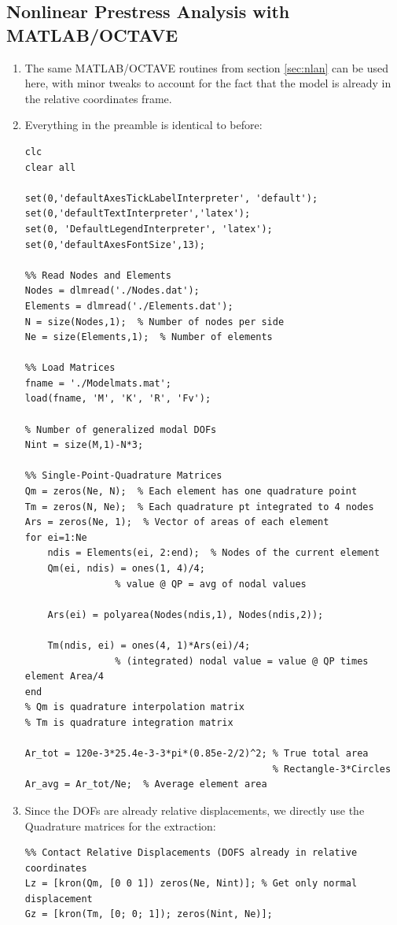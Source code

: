 \documentclass[11pt]{article}
\begin{document}
\subsection{Nonlinear Prestress Analysis with MATLAB/OCTAVE}
\label{sec:orgcf2c400}
\begin{enumerate}
\item The same MATLAB/OCTAVE routines from section \ref{sec:nlan} can be used here, with minor tweaks to account for the fact that the model is already in the relative coordinates frame.
\item Everything in the preamble is identical to before:
\begin{verbatim}
clc
clear all

set(0,'defaultAxesTickLabelInterpreter', 'default');
set(0,'defaultTextInterpreter','latex');
set(0, 'DefaultLegendInterpreter', 'latex');
set(0,'defaultAxesFontSize',13);

%% Read Nodes and Elements
Nodes = dlmread('./Nodes.dat');
Elements = dlmread('./Elements.dat');
N = size(Nodes,1);  % Number of nodes per side
Ne = size(Elements,1);  % Number of elements

%% Load Matrices
fname = './Modelmats.mat';
load(fname, 'M', 'K', 'R', 'Fv');

% Number of generalized modal DOFs
Nint = size(M,1)-N*3;

%% Single-Point-Quadrature Matrices
Qm = zeros(Ne, N);  % Each element has one quadrature point
Tm = zeros(N, Ne);  % Each quadrature pt integrated to 4 nodes
Ars = zeros(Ne, 1);  % Vector of areas of each element
for ei=1:Ne
    ndis = Elements(ei, 2:end);  % Nodes of the current element
    Qm(ei, ndis) = ones(1, 4)/4;
                % value @ QP = avg of nodal values

    Ars(ei) = polyarea(Nodes(ndis,1), Nodes(ndis,2));

    Tm(ndis, ei) = ones(4, 1)*Ars(ei)/4;
                % (integrated) nodal value = value @ QP times element Area/4
end
% Qm is quadrature interpolation matrix
% Tm is quadrature integration matrix

Ar_tot = 120e-3*25.4e-3-3*pi*(0.85e-2/2)^2; % True total area
                                            % Rectangle-3*Circles
Ar_avg = Ar_tot/Ne;  % Average element area
\end{verbatim}
\item Since the DOFs are already relative displacements, we directly use the Quadrature matrices for the extraction:
\begin{verbatim}
%% Contact Relative Displacements (DOFS already in relative coordinates
Lz = [kron(Qm, [0 0 1]) zeros(Ne, Nint)]; % Get only normal displacement
Gz = [kron(Tm, [0; 0; 1]); zeros(Nint, Ne)];


\end{verbatim}
\end{enumerate}
\end{document}
